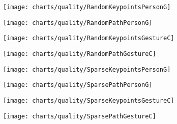     \newpage
    \begin{figure}[!ht]
      \centering
      \texttt{[image: charts/quality/RandomKeypointsPersonG]}
      \caption[]
              {}
      \label{fig:RandomKeypointsPersonG}
    \end{figure}

    \begin{figure}[!ht]
      \centering
      \texttt{[image: charts/quality/RandomPathPersonG]}
      \caption[]
              {}
      \label{fig:RandomPathPersonG}
    \end{figure}

    \newpage
    \begin{figure}[!ht]
      \centering
      \texttt{[image: charts/quality/RandomKeypointsGestureC]}
      \caption[]
              {}
      \label{fig:RandomKeypointsGestureC}
    \end{figure}

    \begin{figure}[!ht]
      \centering
      \texttt{[image: charts/quality/RandomPathGestureC]}
      \caption[]
              {}
      \label{fig:RandomPathGestureC}
    \end{figure}

    \newpage
    \begin{figure}[!ht]
      \centering
      \texttt{[image: charts/quality/SparseKeypointsPersonG]}
      \caption[]
              {}
      \label{fig:SparseKeypointsPersonG}
    \end{figure}

    \begin{figure}[!ht]
      \centering
      \texttt{[image: charts/quality/SparsePathPersonG]}
      \caption[]
              {}
      \label{fig:SparsePathPersonG}
    \end{figure}

    \newpage
    \begin{figure}[!ht]
      \centering
      \texttt{[image: charts/quality/SparseKeypointsGestureC]}
      \caption[]
              {}
      \label{fig:SparseKeypointsGestureC}
    \end{figure}

    \begin{figure}[!ht]
      \centering
      \texttt{[image: charts/quality/SparsePathGestureC]}
      \caption[]
              {}
      \label{fig:SparsePathGestureC}
    \end{figure}

